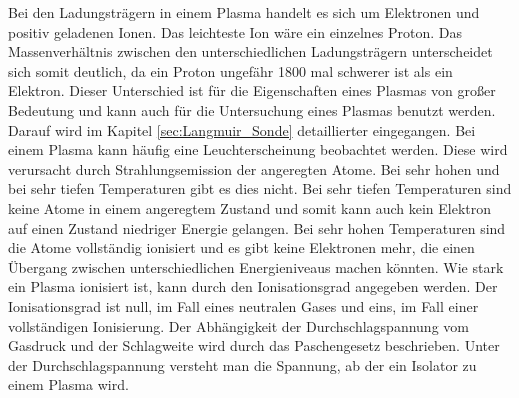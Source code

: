Bei den Ladungsträgern in einem Plasma handelt es sich um Elektronen und positiv geladenen Ionen. Das leichteste Ion wäre ein einzelnes Proton. Das Massenverhältnis zwischen den unterschiedlichen Ladungsträgern unterscheidet sich somit deutlich, da ein Proton ungefähr 1800 mal schwerer ist als ein Elektron. Dieser Unterschied ist für die Eigenschaften eines Plasmas von großer Bedeutung und kann auch für die Untersuchung eines Plasmas benutzt werden. Darauf wird im Kapitel \ref{sec:Langmuir_Sonde} detaillierter eingegangen. Bei einem Plasma kann häufig eine Leuchterscheinung beobachtet werden. Diese wird verursacht durch Strahlungsemission  der angeregten Atome. Bei sehr hohen und bei sehr tiefen Temperaturen gibt es dies nicht. Bei sehr tiefen Temperaturen sind keine Atome in einem angeregtem Zustand und somit kann auch kein Elektron auf einen Zustand niedriger Energie gelangen. Bei sehr hohen Temperaturen sind die Atome vollständig ionisiert und es gibt keine Elektronen mehr, die einen Übergang zwischen unterschiedlichen Energieniveaus machen könnten. Wie stark ein Plasma ionisiert ist, kann durch den  Ionisationsgrad angegeben werden. Der Ionisationsgrad ist null, im Fall eines neutralen Gases und eins, im Fall einer vollständigen Ionisierung. Der Abhängigkeit der Durchschlagspannung vom Gasdruck und der Schlagweite wird durch das Paschengesetz beschrieben. Unter der Durchschlagspannung versteht man die Spannung, ab der ein Isolator zu einem Plasma wird. 
